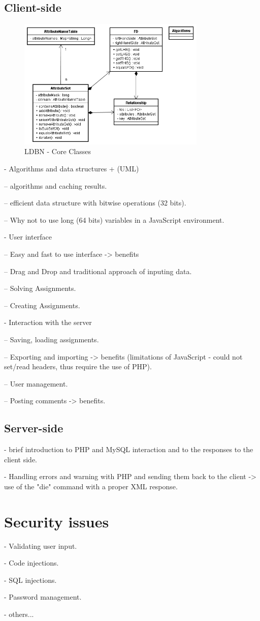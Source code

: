 \subsection{Client-side}

\begin{figure}[h]
	\begin{center}
		\includegraphics[width=0.8\textwidth]{./img/uml01.png}
		\caption{LDBN - Core Classes}
		\label{fig:coreuml}
	\end{center}
\end{figure}

- Algorithms and data structures + (UML)

-- algorithms and caching results.

-- efficient data structure with bitwise operations (32 bits).

-- Why not to use long (64 bits) variables in a JavaScript environment.

- User interface

-- Easy and fast to use interface -> benefits

-- Drag and Drop and traditional approach of inputing data.

-- Solving Assignments.

-- Creating Assignments.

- Interaction with the server

-- Saving, loading assignments.

-- Exporting and importing -> benefits (limitations of JavaScript - could not set/read headers, thus require the use of PHP).
 
-- User management.

-- Posting comments -> benefits.

\subsection{Server-side}
- brief introduction to PHP and MySQL interaction and to the responses to the client side.

- Handling errors and warning with PHP and sending them back to the client -> use of the "die" command with a proper XML response.


\section{Security issues}
- Validating user input.

- Code injections.

- SQL injections.

- Password management.

- others...
